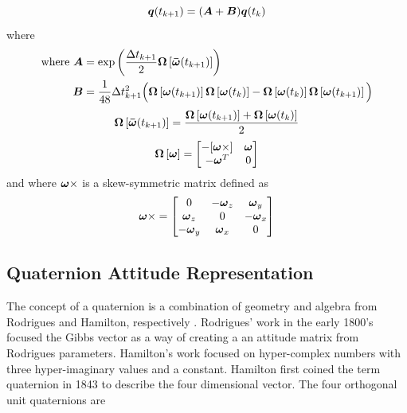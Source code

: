 \begin{equation}
  \boldsymbol{q}(t_{k+1}) = ( \boldsymbol{A} + \boldsymbol{B} ) \boldsymbol{q}(t_{k}) \\
  \label{eqn:DiscreteQuaternionPropagation}
\end{equation}
where
\begin{equation}
  \begin{aligned}
    \text{where } \boldsymbol{A} &= \exp \left( \frac{\Delta t_{k+1}}{2} \boldsymbol{\Omega} \left[ \boldsymbol{\bar{\omega}}(t_{k+1}) \right] \right)\\
    \boldsymbol{B} &= \frac{1}{48} \Delta t_{k+1}^2 \Big(
    \boldsymbol{\Omega} \left[\boldsymbol{\omega}(t_{k+1}) \right]
    \boldsymbol{\Omega} \left[\boldsymbol{\omega}(t_{k})   \right] -
    \boldsymbol{\Omega} \left[\boldsymbol{\omega}(t_{k})   \right]
    \boldsymbol{\Omega} \left[\boldsymbol{\omega}(t_{k+1}) \right]
      \Big)
  \end{aligned}
\end{equation}
\begin{equation}
    \boldsymbol{\Omega} \left[ \boldsymbol{\bar{\omega}}(t_{k+1}) \right] = \frac{\boldsymbol{\Omega} \left[\boldsymbol{\omega}(t_{k+1}) \right] + \boldsymbol{\Omega} \left[\boldsymbol{\omega}(t_{k}) \right]}{2}
    \label{eqn:DiscreteQuaternionToBodyRate}
\end{equation}
\begin{equation}
  \boldsymbol{\Omega} \left[ \boldsymbol{\omega} \right] =
  \begin{bmatrix}
    - [ \boldsymbol{\omega} \times ] & \boldsymbol{\omega} \\
    - \boldsymbol{\omega}^T & 0 \\
  \end{bmatrix}
  \label{eqn:OmegaMatrix}
\end{equation}
and where $\boldsymbol{\omega} \times$ is a skew-symmetric matrix defined as
\begin{equation}
  \boldsymbol{\omega} \times =
  \begin{bmatrix}
    0 & -\boldsymbol{\omega}_z & \boldsymbol{\omega}_y \\
    \boldsymbol{\omega}_z & 0 & -\boldsymbol{\omega}_x \\
    -\boldsymbol{\omega}_y & \boldsymbol{\omega}_x & 0 \\
  \end{bmatrix}
\end{equation}


\subsection{Quaternion Attitude Representation}
\label{subsec:QuaternionAttitude}

The concept of a quaternion is a combination of geometry and algebra from Rodrigues and Hamilton, respectively \cite{shuster}.  Rodrigues' work in the early 1800's focused the Gibbs vector as a way of creating a an attitude matrix from Rodrigues parameters.  Hamilton's work focused on hyper-complex numbers with three hyper-imaginary values and a constant.  Hamilton first coined the term quaternion in 1843 to describe the four dimensional vector.  The four orthogonal unit quaternions are

